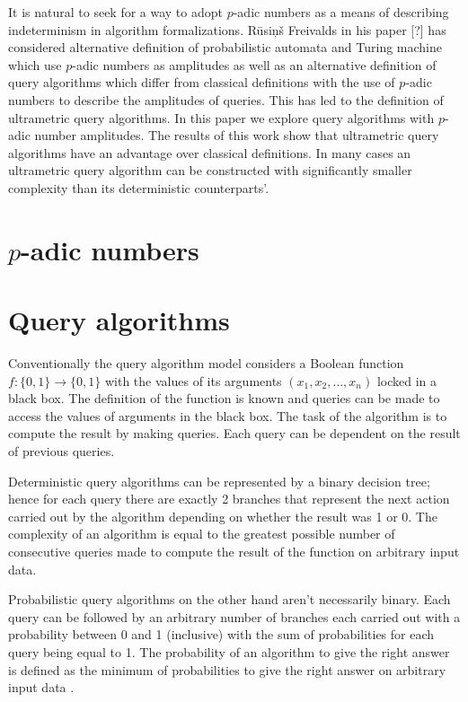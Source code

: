 \documentclass{llncs}
\begin{document}
It is natural to seek for a way to adopt $p$-adic  numbers as a means of describing indeterminism in algorithm formalizations. Rūsiņš Freivalds in his paper [?] has considered alternative definition of probabilistic automata and Turing machine which use $p$-adic numbers as amplitudes as well as an alternative definition of query algorithms which differ from classical definitions with the use of $p$-adic numbers to describe the amplitudes of queries. This has led to the definition of ultrametric query algorithms.
In this paper we explore query algorithms with $p$-adic number amplitudes. The results of this work show that ultrametric query algorithms have an advantage over classical definitions. In many cases an ultrametric query algorithm can be constructed with significantly smaller complexity than its deterministic counterparts'.

\section{$p$-adic numbers}

\section{Query algorithms}
Conventionally the query algorithm model considers a Boolean function $f:\{0,1\}\rightarrow\{0,1\}$ with the values of its arguments $(x_1,x_2,\ldots,x_n)$ locked in a black box. The definition of the function is known and queries can be made to access the values of arguments in the black box. The task of the algorithm is to compute the result by making queries. Each query can be dependent on the result of previous queries.

Deterministic query algorithms can be represented by a binary decision tree; hence for each query there are exactly 2 branches that represent the next action carried out by the algorithm depending on whether the result was 1 or 0. The complexity of an algorithm is equal to the greatest possible number of consecutive queries made to compute the result of the function on arbitrary input data.

Probabilistic query algorithms on the other hand aren’t necessarily binary. Each query can be followed by an arbitrary number of branches each carried out with a probability between 0 and 1 (inclusive) with the sum of probabilities for each query being equal to 1. The probability of an algorithm to give the right answer is defined as the minimum of probabilities to give the right answer on arbitrary input data%
.
\end{document}
